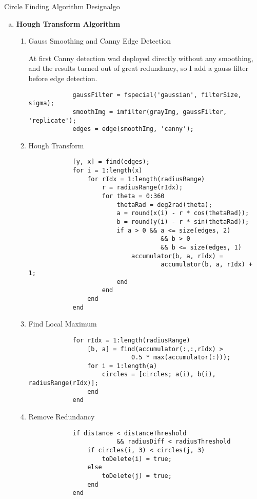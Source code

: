 \begin{problem}{Circle Finding Algorithm Design}{algo}
\begin{enumerate}[(a)]
    
    \item \textbf{Hough Transform Algorithm}
        \begin{enumerate}[label = (\roman*)]
            \item Gauss Smoothing and Canny Edge Detection
            
            At first Canny detection wad deployed directly without any smoothing, and the results turned out of great redundancy, so I add a gauss filter before edge detection.
            \begin{verbatim}
            gaussFilter = fspecial('gaussian', filterSize, sigma);
            smoothImg = imfilter(grayImg, gaussFilter, 'replicate');
            edges = edge(smoothImg, 'canny');
            \end{verbatim}
            \item Hough Transform

             \begin{verbatim}
            [y, x] = find(edges);
            for i = 1:length(x)
                for rIdx = 1:length(radiusRange)
                    r = radiusRange(rIdx);
                    for theta = 0:360
                        thetaRad = deg2rad(theta);
                        a = round(x(i) - r * cos(thetaRad));
                        b = round(y(i) - r * sin(thetaRad));
                        if a > 0 && a <= size(edges, 2) 
                                    && b > 0 
                                    && b <= size(edges, 1)
                            accumulator(b, a, rIdx) = 
                                    accumulator(b, a, rIdx) + 1;
                        end
                    end
                end
            end
            \end{verbatim}
            \item Find Local Maximum
            \begin{verbatim}
            for rIdx = 1:length(radiusRange)
                [b, a] = find(accumulator(:,:,rIdx) > 
                            0.5 * max(accumulator(:))); 
                for i = 1:length(a)
                    circles = [circles; a(i), b(i), radiusRange(rIdx)];
                end
            end
            \end{verbatim}
            \item Remove Redundancy
            \begin{verbatim}
            if distance < distanceThreshold 
                        && radiusDiff < radiusThreshold
                if circles(i, 3) < circles(j, 3)
                    toDelete(i) = true;
                else
                    toDelete(j) = true;
                end
            end
            \end{verbatim}
    \end{enumerate}
    
\end{enumerate}
\end{problem}

